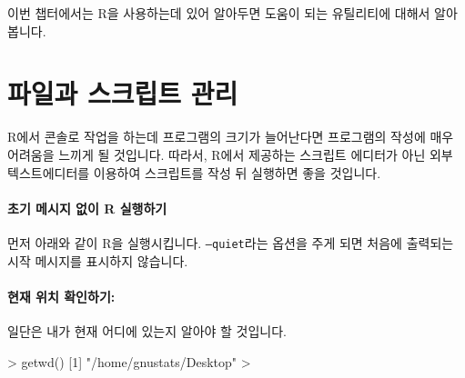 %
%
%
%
%

이번 챕터에서는 R을 사용하는데 있어 알아두면 도움이 되는 유틸리티에 대해서 알아봅니다.


\section{파일과 스크립트 관리}

R에서 콘솔로 작업을 하는데 프로그램의 크기가 늘어난다면 프로그램의 작성에 매우 어려움을 느끼게 될 것입니다.
따라서, R에서 제공하는 스크립트 에디터가 아닌 외부 텍스트에디터를 이용하여 스크립트를 작성 뒤 실행하면 좋을 것입니다.

\paragraph{초기 메시지 없이 R 실행하기}
먼저 아래와 같이 R을 실행시킵니다. 
\texttt{--quiet}라는 옵션을 주게 되면 처음에 출력되는 시작 메시지를 표시하지 않습니다. 

\begin{Schunk}
\end{Schunk}

\paragraph{현재 위치 확인하기:}
일단은 내가 현재 어디에 있는지 알아야 할 것입니다.
\begin{Schunk}
\begin{Soutput}
> getwd()
[1] "/home/gnustats/Desktop"
> 
\end{Soutput}
\end{Schunk}


